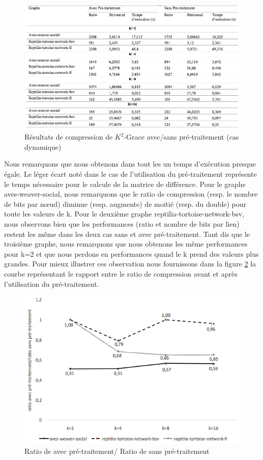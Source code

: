 \begin{figure}[H]
	\centering
	\includegraphics[scale=0.48]{ressources/image/ik2.png}
	\caption{Résultats de compression de $K^2$-Grace avec/sans pré-traitement (cas dynamique)}
	\label{res-dyn-tst}
\end{figure}

Nous remarquons que nous obtenons dans tout les un temps d'exécution presque égale. Le léger écart noté dans le cas de l'utilisation du pré-traitement représente le temps nécessaire pour le calcule de la matrice de différence. 
Pour le graphe aves-weaver-social, nous remarquons que le ratio de compression (resp. le nombre de bits par nœud) diminue (resp. augmente) de moitié (resp. du double) pour toute les valeurs de k. Pour le deuxième graphe reptilia-tortoise-network-bsv, nous observons bien que les performances (ratio et nombre de bits par lien) restent les même dans les deux cas sans et avec pré-traitement. Tant dis que le troisième graphe, nous remarquons que nous obtenons les même performances pour k=2 et que nous perdons en performances quand le k prend des valeurs plus grandes. Pour mieux illustrer ces observation nous fournissons dans la figure \ref{perte } la courbe représentant le rapport entre le ratio de compression avant et après l'utilisation du pré-traitement. 


\begin{figure}[H]
	\centering
	\includegraphics[scale=0.5]{ressources/image/perteIk2.png}
	
	\caption{Ratio de avec pré-traitement/ Ratio de sans pré-traitement}
	\label{perte }
\end{figure}

